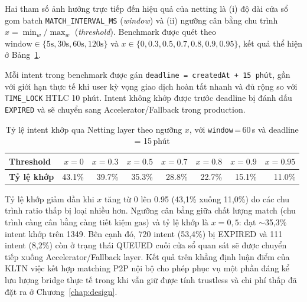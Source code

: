 Hai tham số ảnh hưởng trực tiếp đến hiệu quả của netting là (i) độ dài cửa sổ gom batch
\texttt{MATCH\_INTERVAL\_MS} (\emph{window}) và (ii) ngưỡng cân bằng chu trình
$x = \min_w/\max_w$ (\emph{threshold}). Benchmark được quét theo
$\text{window} \in \{5\text{s}, 30\text{s}, 60\text{s}, 120\text{s}\}$ và
$x \in \{0, 0.3, 0.5, 0.7, 0.8, 0.9, 0.95\}$, kết quả thể hiện ở
Bảng~\ref{tab:c4-results}.

Mỗi intent trong benchmark được gán \texttt{deadline = createdAt + 15 phút}, gần với giới
hạn thực tế khi user kỳ vọng giao dịch hoàn tất nhanh và đủ rộng so với \texttt{TIME\_LOCK}
HTLC 10 phút. Intent không khớp được trước deadline bị đánh dấu \texttt{EXPIRED} và sẽ
chuyển sang Accelerator/Fallback trong production.

\begin{table}[H]
    \centering
    \caption{Tỷ lệ intent khớp qua Netting layer theo ngưỡng $x$, với \texttt{window}\,=\,60\,s và deadline = 15\,phút}
    \label{tab:c4-results}
    \begin{tabular}{|l|r|r|r|r|r|r|r|}
        \hline
        \textbf{Threshold} & $x=0$ & $x=0.3$ & $x=0.5$ & $x=0.7$ & $x=0.8$ & $x=0.9$ & $x=0.95$ \\
        \hline
        \textbf{Tỷ lệ khớp} & 43.1\% & 39.7\% & 35.3\% & 28.8\% & 22.7\% & 15.1\% & 11.0\% \\
        \hline
    \end{tabular}
\end{table}

Tỷ lệ khớp giảm dần khi $x$ tăng từ 0 lên 0.95 (43{,}1\% xuống 11{,}0\%) do các chu trình
ratio thấp bị loại nhiều hơn. Ngưỡng cân bằng giữa chất lượng match (chu trình càng cân
bằng càng tiết kiệm gas) và tỷ lệ khớp là $x=0{,}5$: đạt $\sim$35{,}3\% intent khớp trên
1349. Bên cạnh đó, 720 intent (53{,}4\%) bị EXPIRED và 111 intent (8{,}2\%) còn ở trạng
thái QUEUED cuối cửa sổ quan sát sẽ được chuyển tiếp xuống Accelerator/Fallback layer. Kết quả trên khẳng định 
luận điểm của KLTN việc kết hợp matching P2P nội bộ cho phép phục
vụ một phần đáng kể lưu lượng bridge thực tế trong khi vẫn giữ được tính trustless và
chi phí thấp đã đặt ra ở Chương~\ref{chap:design}.
